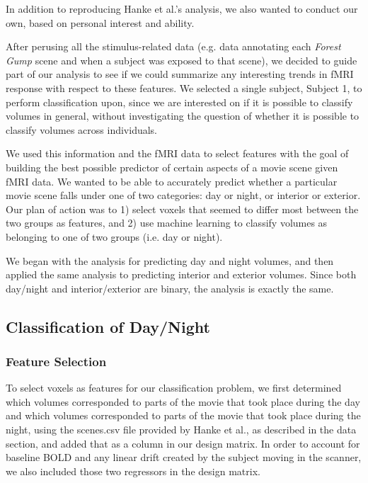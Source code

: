 \documentclass[11pt]{article}
\begin{document}
In addition to reproducing Hanke et al.'s analysis, we also wanted to
conduct our own, based on personal interest and ability.

After perusing all the stimulus-related data (e.g. data annotating each 
\emph{Forest Gump} scene and when a subject was exposed to that scene), we 
decided to guide part of our analysis to see if we could
summarize any interesting trends in fMRI response with respect to these
features. We selected a single subject, Subject 1, to perform classification
upon, since we are interested on if it is possible to classify volumes in
general, without investigating the question of whether it is possible to 
classify volumes across individuals.

We used this information and the fMRI data to select features with the goal of
building the best possible predictor of certain aspects of a movie scene given
fMRI data. We wanted to be able to accurately predict whether a particular
movie scene falls under one of two categories: day or night, or interior or 
exterior.  Our plan of action was to 1) select voxels that seemed to differ most 
between the two groups as features, and 2) use machine learning to classify 
volumes as belonging to one of two groups (i.e. day or night).

We began with the analysis for predicting day and night volumes, and then
applied the same analysis to predicting interior and exterior volumes.  
Since both day/night and interior/exterior are binary, the analysis is
exactly the same.

\subsection{Classification of Day/Night}

\subsubsection{Feature Selection}

To select voxels as features for our classification problem, we first
determined which volumes corresponded to parts of the movie that took place 
during the day and which volumes corresponded to parts of the movie that took place 
during the night, using the scenes.csv file provided by Hanke et al., as 
described in the data section, and added that as a column in our design matrix.  
In order to account for baseline BOLD and any linear drift created by the subject 
moving in the scanner, we also included those two regressors in the design matrix.  
\end{document}
